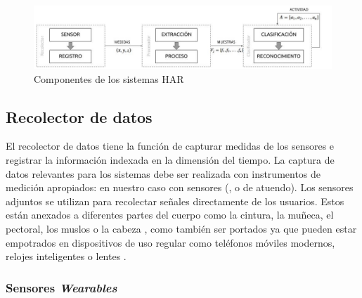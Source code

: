 \begin{figure}[!tbph]
\centering{}\includegraphics[width=1\linewidth]{capitulo-4/graphics/diagrama_4_1}\caption{Componentes de los sistemas HAR}
\label{fig41:componentes-har}
\end{figure}


\subsection{Recolector de datos}

El recolector de datos tiene la función de capturar medidas de los
sensores e registrar la información indexada en la dimensión del tiempo.
La captura de datos relevantes para los sistemas  debe
ser realizada con instrumentos de medición apropiados: en nuestro
caso con sensores (, o de atuendo). Los sensores
adjuntos se utilizan para recolectar señales directamente de los usuarios.
Estos están anexados a diferentes partes del cuerpo como la cintura,
la muñeca, el pectoral, los muslos o la cabeza \cite{Bao2004}, como
también ser portados ya que pueden estar empotrados en dispositivos
de uso regular como teléfonos móviles modernos, relojes inteligentes
o lentes \cite{LaraLabrador2012,Choudhury2008}.

\subsubsection{Sensores \emph{Wearables}}

